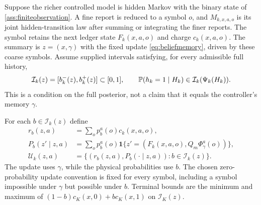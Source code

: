 Suppose the richer controlled model is hidden Markov with the binary state
of \cref{ass:finiteobservation}. A fine report is reduced to a symbol $o$,
and $M_{k,x,a,o}$ is its joint hidden-transition law after summing or
integrating the finer reports. The symbol retains the next ledger state
$F_k(x,a,o)$ and charge $c_k(x,a,o)$. The summary is $z=(x,\gamma)$ with
the fixed update \eqref{eq:beliefmemory}, driven by these coarse symbols.
Assume supplied intervals satisfying, for every admissible full history,
\begin{equation}\label{eq:posteriorfiber}
 \mathcal I_k(z)=[b_k^-(z),b_k^+(z)]\subset[0,1]
 ,\qquad \mathbb P(h_k=1\mid H_k)\in\mathcal I_k(\Psi_k(H_k)).
\end{equation}
This is a condition on the full posterior, not a claim that it equals
the controller's memory $\gamma$.

For each $b\in\mathcal I_k(z)$ define
\begin{align}\label{eq:binarysummaryenvelope}
 r_b(z,a)&=\sum_o p_b^a(o)c_k(x,a,o),\nonumber\\
 P_b(z'\mid z,a)&=\sum_o p_b^a(o)
 \mathbf 1\{z'=(F_k(x,a,o),Q_m\Phi_\gamma^a(o))\},\\
 \mathcal U_k(z,a)&=\{(r_b(z,a),P_b(\cdot\mid z,a)):
                                      b\in\mathcal I_k(z)\}.\nonumber
\end{align}
The update uses $\gamma$, while the physical probabilities use $b$.
The chosen zero-probability update convention is fixed for every symbol,
including a symbol impossible under $\gamma$ but possible under $b$.
Terminal bounds are the minimum and maximum of
$(1-b)c_K(x,0)+bc_K(x,1)$ on $\mathcal I_K(z)$.

